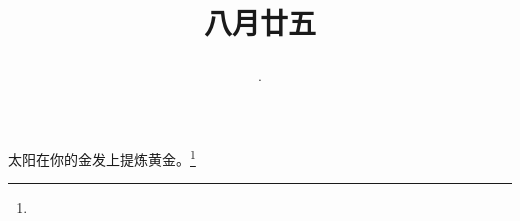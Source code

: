 \title{\date[d=27,m=9,y=2024][year:cn-y,年,month:cn,day:cn,日,·,weekday]·八月廿五 }
太阳在你的金发上提炼黄金。\footnote{ }

